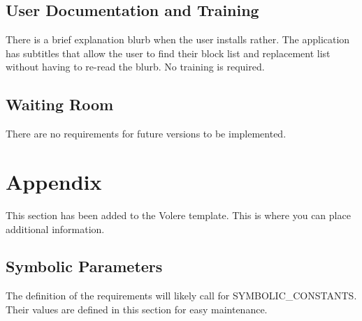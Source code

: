 \documentclass[12pt, titlepage]{article}
\begin{document}
\subsection{User Documentation and Training}
There is a brief explanation blurb when the user installs rather. The application has subtitles that allow the user to find their block list and replacement list without having to re-read the blurb. No training is required.

\subsection{Waiting Room}
There are no requirements for future versions to be implemented.

\section{Appendix}
This section has been added to the Volere template.  This is where you can place
additional information.

\subsection{Symbolic Parameters}
The definition of the requirements will likely call for SYMBOLIC\_CONSTANTS.
Their values are defined in this section for easy maintenance.
\end{document}
